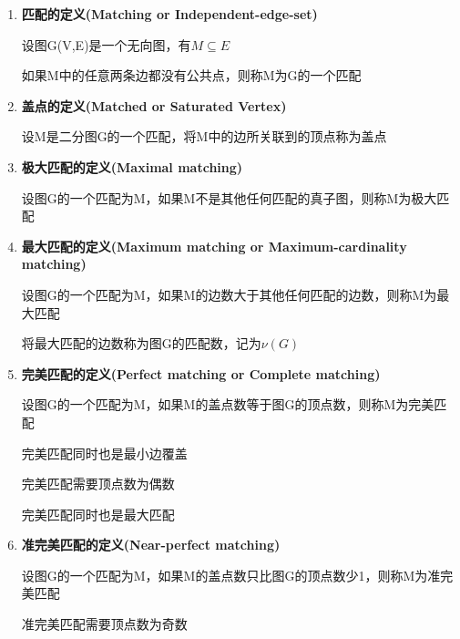 \documentclass[UTF8]{ctexart}
\begin{document}
\begin{enumerate}
      \item

            \textbf{匹配的定义(Matching or Independent-edge-set)}

            设图G(V,E)是一个无向图，有$M\subseteq E$

            如果M中的任意两条边都没有公共点，则称M为G的一个匹配



      \item

            \textbf{盖点的定义(Matched or Saturated Vertex) }

            设M是二分图G的一个匹配，将M中的边所关联到的顶点称为盖点



      \item

            \textbf{极大匹配的定义(Maximal matching) }

            设图G的一个匹配为M，如果M不是其他任何匹配的真子图，则称M为极大匹配



      \item

            \textbf{最大匹配的定义(Maximum matching or Maximum-cardinality matching) }

            设图G的一个匹配为M，如果M的边数大于其他任何匹配的边数，则称M为最大匹配

            将最大匹配的边数称为图G的匹配数，记为$\nu(G)$





      \item
            \textbf{完美匹配的定义(Perfect matching or Complete matching) }

            设图G的一个匹配为M，如果M的盖点数等于图G的顶点数，则称M为完美匹配

            完美匹配同时也是最小边覆盖

            完美匹配需要顶点数为偶数

            完美匹配同时也是最大匹配


      \item


            \textbf{准完美匹配的定义(Near-perfect matching) }

            设图G的一个匹配为M，如果M的盖点数只比图G的顶点数少1，则称M为准完美匹配

            准完美匹配需要顶点数为奇数


\end{enumerate}
\end{document}

